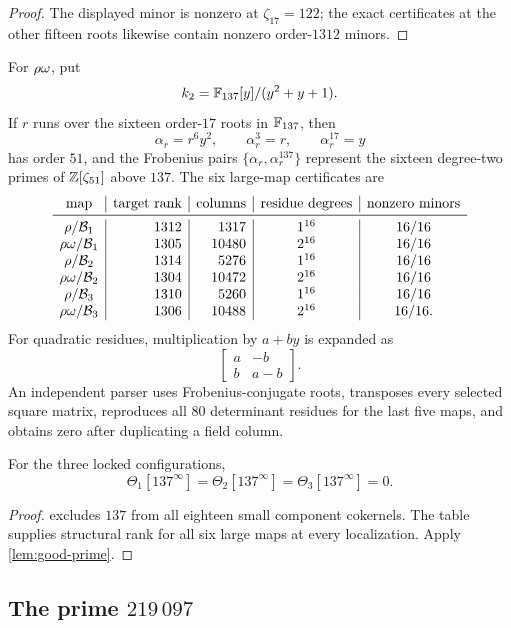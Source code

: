 \begin{proof}
The displayed minor is nonzero at \(\zeta_{17}=122\); the exact
certificates at the other fifteen roots likewise contain nonzero
order-\(1312\) minors.
\end{proof}

For \(\rho\omega\), put
\[
 k_2=\mathbb F_{137}[y]/(y^2+y+1).
\]
If \(r\) runs over the sixteen order-\(17\) roots in \(\mathbb F_{137}\), then
\[
 \alpha_r=r^6y^2,\qquad
 \alpha_r^3=r,\qquad
 \alpha_r^{17}=y
\]
has order \(51\), and the Frobenius pairs
\(\{\alpha_r,\alpha_r^{137}\}\) represent the sixteen degree-two primes
of \(\mathbb Z[\zeta_{51}]\) above \(137\).  The six large-map certificates are
\[
\begin{array}{c|r|r|c|c}
\text{map}&\text{target rank}&\text{columns}&
 \text{residue degrees}&\text{nonzero minors}\\
\midrule
\rh/\cB_1&1312&1317&1^{16}&16/16\\
\rh\om/\cB_1&1305&10480&2^{16}&16/16\\
\rh/\cB_2&1314&5276&1^{16}&16/16\\
\rh\om/\cB_2&1304&10472&2^{16}&16/16\\
\rh/\cB_3&1310&5260&1^{16}&16/16\\
\rh\om/\cB_3&1306&10488&2^{16}&16/16.
\end{array}
\]
For quadratic residues, multiplication by \(a+by\) is expanded as
\[
 \begin{bmatrix}a&-b\\ b&a-b\end{bmatrix}.
\]
An independent parser uses Frobenius-conjugate roots, transposes every
selected square matrix, reproduces all \(80\) determinant residues for
the last five maps, and obtains zero after duplicating a field column.

\begin{theorem}
\label{thm:theta137}
For the three locked configurations,
\[
 \Theta_1[137^\infty]
 =\Theta_2[137^\infty]
 =\Theta_3[137^\infty]
 =0.
\]
\end{theorem}

\begin{proof}
 excludes \(137\) from all eighteen small
component cokernels.  The table supplies structural rank for all six
large maps at every localization.  Apply \cref{lem:good-prime}.
\end{proof}

\subsection{The prime \(219\,097\)}

